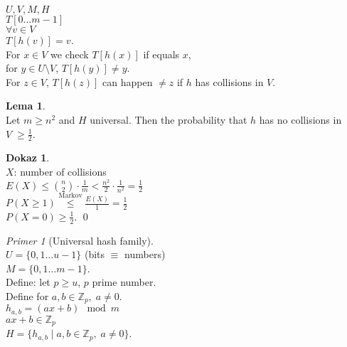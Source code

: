 \documentclass[a4paper, 12pt]{book}
\theoremstyle{definition}
\newtheorem{lemma}[counter]{Lema}
\newtheorem{pro}[counter]{Dokaz}
\theoremstyle{remark}
\newtheorem*{ex}{Primer}
\newcommand{\Z}{\mathbb{Z}}
\begin{document}
$U, V, M, H$ \\
$T[0 \dots m-1]$ \\
$\forall v \in V$ \\
$T[h(v)] = v$. \\
For $x \in V$ we check $T[h(x)]$ if equals $x$, \\
for $y \in U \setminus V$, $T[h(y)] \neq y$. \\
For $z \in V$, $T[h(z)]$ can happen $\neq z$ if $h$ has collisions in $V$.
\begin{lemma} \text{} \\
  Let $m \geq n^2$ and $H$ universal.
  Then the probability that $h$ has no collisions in $V \; \geq \frac{1}{2}$.
\end{lemma}
\begin{pro} \text{} \\
  $X$: number of collisions \\
  $E(X) \leq \binom{n}{2} \cdot \frac{1}{m} < \frac{n^2}{2} \cdot \frac{1}{n^2} = \frac{1}{2}$ \\
  $P(X \geq 1) \stackrel{\text{Markov}}{\leq} \frac{E(X)}{1} = \frac{1}{2}$ \\
  $P(X = 0) \geq \frac{1}{2}$.
  \qed
\end{pro}
\begin{ex}[Universal hash family] \text{} \\
  $U = \{0, 1 \dots u-1\}$ (bits $\equiv$ numbers) \\
  $M = \{0, 1 \dots m-1\}$. \\
  Define: let $p \geq u$, $p$ prime number. \\
  Define for $a, b \in \Z_p, \; a \neq 0$. \\
  $h_{a,b} = (ax + b) \mod m$ \\
  $ax + b \in \Z_p$ \\
  $H = \{h_{a,b} \mid a, b \in \Z_p, \; a \neq 0\}$.
\end{ex}
\end{document}
